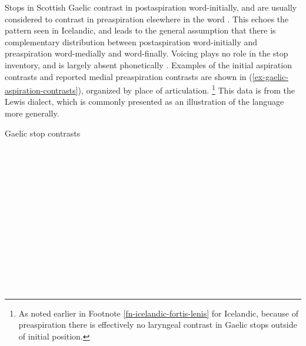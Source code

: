 \documentclass[output=paper,colorlinks,citecolor=brown]{langscibook}
\begin{document}
Stops in Scottish Gaelic contrast in postaspiration word-initially, and are usually considered to contrast in preaspiration elsewhere in the word \citep{ladefogedetal1998,nancestuartsmith2013,nanceomaolalaigh2021}. This echoes the pattern seen in Icelandic, and leads to the general assumption that there is complementary distribution between postaspiration word-initially and preaspiration word-medially and word-finally. Voicing plays no role in the stop inventory, and is largely absent phonetically \citep{nancestuartsmith2013}. 
Examples of the initial aspiration contrasts and reported medial preaspiration contrasts are shown in (\ref{ex-gaelic-aspiration-contrasts}), organized by place of articulation.%
\footnote{As noted earlier in Footnote \ref{fn-icelandic-fortis-lenis} for Icelandic, because of preaspiration there is effectively no laryngeal contrast in Gaelic stops outside of initial position.}
This data is from the Lewis dialect, which is commonly presented as an illustration of the language more generally.

\ea Gaelic stop contrasts \citep[263, 267]{nanceomaolalaigh2021}\label{ex-gaelic-aspiration-contrasts}
\ea 
\ea {}	 \tab\relax [{p}oː]	\tab  {}\\ 
	 	 \tab\relax [{pʰ}ɔul̪ˠ]	\tab  {} \\
     \ex {}	 \tab\relax [o{p}ɪɾʲ]\tab  {} \\ 
      \tab\relax [kʰa{hp}əl̪ˠ]	\tab  {} 
     \z

\ex 
\ea {}	    \tab\relax [{t̪}in̪ʲə]	\tab  {}  \\
	 	\tab\relax [{t̪ʰ}ikʃin̪ʲ]	\tab  {} \\
     \ex {}	    \tab\relax [fa{t̪}ə]	\tab  {}	   \\
     	    \tab\relax [pa{ht̪}ə]	\tab  {} 	\\
     \ex {}       \tab\relax [pa{t̪}] \tab  {}    \\
            \tab\relax [kʰa{ht̪}] \tab  {} 
     \z

\ex 
\ea {}	    \tab\relax [{tʃ}ɔx]	\tab  {} \\
	 	\tab{}\tab  {}  
     \z

\ex 
\ea {}	\tab\relax [{c}ɔːl̪ˠə]	\tab  {}     \\
	 	\tab\relax [{cʰ}ɔːl̪ˠ]	\tab  {}  \\
   \ex  {}	\tab\relax [ɛ{c}ə]	\tab  {}      \\
     	\tab\relax [e{hc}ə]	\tab  {}
     \z
                    
\end{document}
